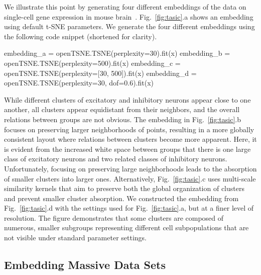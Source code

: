 \documentclass[article]{jss}
\begin{document}
We illustrate this point by generating four different embeddings of the data on
single-cell gene expression in mouse brain~\citep{tasic2018shared}.
Fig.~\ref{fig:tasic}.a shows an embedding using default t-SNE parameters. We generate
the four different embeddings using the following code snippet (shortened for clarity).
\begin{CodeChunk}
\begin{CodeInput}
embedding_a = openTSNE.TSNE(perplexity=30).fit(x)
embedding_b = openTSNE.TSNE(perplexity=500).fit(x)
embedding_c = openTSNE.TSNE(perplexity=[30, 500]).fit(x)
embedding_d = openTSNE.TSNE(perplexity=30, dof=0.6).fit(x)
\end{CodeInput}
\end{CodeChunk}
While different clusters of excitatory and inhibitory neurons appear close to one another, all clusters appear equidistant from their neighbors, and the overall relations between groups are not obvious. The embedding in Fig.~\ref{fig:tasic}.b focuses on preserving larger neighborhoods of points, resulting in a more globally consistent layout where relations between clusters become more apparent. Here, it is evident from the increased white space between groups that there is one large class of excitatory neurons and two related classes of inhibitory neurons. Unfortunately, focusing on preserving large neighborhoods leads to the absorption of smaller clusters into larger ones. Alternatively, Fig.~\ref{fig:tasic}.c uses multi-scale similarity kernels that aim to preserve both the global organization of clusters and prevent smaller cluster absorption. We constructed the embedding from Fig.~\ref{fig:tasic}.d with the settings used for Fig.~\ref{fig:tasic}.a, but at a finer level of resolution. The figure demonstrates that some clusters are composed of numerous, smaller subgroups representing different cell subpopulations that are not visible under standard parameter settings.

\subsection{Embedding Massive Data Sets}
\end{document}
